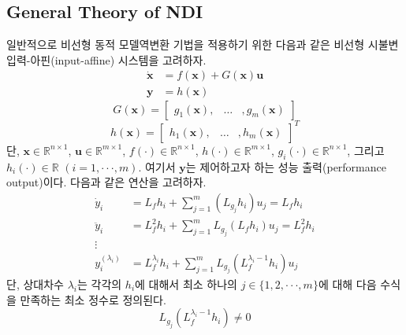 \documentclass[a4paper, 12pt]{report}
\begin{document}
	\subsection{General Theory of NDI}
일반적으로 비선형 동적 모델역변환 기법을 적용하기 위한 다음과 같은 비선형 시불변 입력-아핀(input-affine) 시스템을 고려하자.
\begin{equation}\label{Eq:NDI_sys}
  \begin{split}
    \dot{\mathbf{x}} &= f(\mathbf{x}) + G(\mathbf{x})\mathbf{u} \\
    \mathbf{y} &= h(\mathbf{x})
  \end{split}
\end{equation}
\begin{equation}\label{Eq:InputMTRX}
  G(\mathbf{x}) =
  \begin{bmatrix}
    g_{1}(\mathbf{x}), & \dots & ,g_{m}(\mathbf{x})
  \end{bmatrix}
\end{equation}
\begin{equation}\label{Eq:outputMTRX}
  h(\mathbf{x}) =
  \begin{bmatrix}
    h_{1}(\mathbf{x}), & \dots & ,h_{m}(\mathbf{x})
  \end{bmatrix}^{T}
\end{equation}
단, $\mathbf{x} \in \mathbb{R}^{n\times1}$, $\mathbf{u} \in \mathbb{R}^{m\times1}$, $f(\cdot) \in \mathbb{R}^{n\times1}$, $h(\cdot) \in \mathbb{R}^{m\times1}$, $g_{i}(\cdot) \in \mathbb{R}^{n\times1}$, 그리고 $h_{i}(\cdot) \in \mathbb{R}\,\,(i=1,\cdot\cdot\cdot,m)$. 여기서 $\mathbf{y}$는 제어하고자 하는 성능 출력(performance output)이다. 다음과 같은 연산을 고려하자.
\begin{equation}\label{Eq:output_dere}
  \begin{split}
    \dot{y}_{i} &= L_{f}h_{i} + \sum_{j=1}^{m}( L_{g_{j}}h_{i} )u_{j} = L_{f}h_{i} \\
    \ddot{y}_{i} &= L_{f}^{2}h_{i} + \sum_{j=1}^{m}L_{g_{j}}( L_{f}h_{i} )u_{j} = L_{f}^{2}h_{i} \\
     \vdots  \\
    y_{i}^{(\lambda_{i})} &= L_{f}^{\lambda_{i}}h_{i} + \sum_{j=1}^{m}L_{g_{j}}( L_{f}^{\lambda_{i}-1}h_{i} )u_{j}
  \end{split}
\end{equation}
단, 상대차수 $\lambda_{i}$는 각각의 $h_{i}$에 대해서 최소 하나의 $j \in \{1,2,\cdot\cdot\cdot,m\}$에 대해 다음 수식을 만족하는 최소 정수로 정의된다.
\begin{equation}\label{Eq:rela_deg_cond}
  L_{g_{j}}( L_{f}^{\lambda_{i}-1}h_{i} ) \neq 0
\end{equation}
\end{document}
